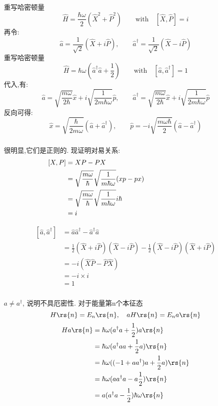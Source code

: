 \begin{frame}
    \frametitle{}
  重写哈密顿量
    \[  \hat{H}= \frac{\hbar \omega }{2} (\hat{X}^2 + \hat{P}^2 ) \qquad \text{with} \quad [\hat{X},\hat{P}]=i \]
  再令:
  \[ \hat{a}= \frac{1 }{\sqrt{2}} (\hat{X} + i\hat{P} ), \qquad \hat{a}^\dagger= \frac{1 }{\sqrt{2}} (\hat{X} - i\hat{P} ) \]
  重写哈密顿量
  \[  \hat{H}= \hbar \omega \left(\hat{a}^\dagger \hat{a} + \frac{1 }{2}\right) \qquad \text{with} \quad [\hat{a},\hat{a}^\dagger]=1 \]
  代入,有:
  \[ \hat{a}= \sqrt{\frac{m\omega}{2\hbar}}\hat{x} + i \sqrt{\frac{1}{2 m \hbar \omega}} \hat{p}, \qquad 
  \hat{a}^\dagger= \sqrt{\frac{m\omega}{2\hbar}}\hat{x} + i \sqrt{\frac{1}{2 m \hbar \omega}} \hat{p}\]
  反向可得:
  \[ \hat{x}= \sqrt{\frac{\hbar}{2m\omega}} (\hat{a}+ \hat{a}^\dagger), \qquad 
  \hat{p}= -i \sqrt{\frac{m \omega \hbar}{2}} (\hat{a}-\hat{a}^\dagger)\]
\end{frame}

\begin{frame}
    \frametitle{}
    很明显,它们是正则的. 现证明对易关系: 
  \[ \begin{aligned}
      [X,P] &=   XP- PX \\ 
      &=  \sqrt{\frac{m\omega}{\hbar}} \sqrt{\frac{1}{m \hbar \omega}}   (xp-px)  {\hspace*{8em}}~~\\
      &=  \sqrt{\frac{m\omega}{\hbar}} \sqrt{\frac{1}{m \hbar \omega}} i \hbar  \\
      &= i
  \end{aligned}\]
   
  \[ \begin{aligned}
       [\hat{a},\hat{a}^\dagger] &=   \hat{a}\hat{a}^\dagger - \hat{a}^\dagger\hat{a} \\ 
       &= \frac{1}{2} (\hat{X} + i\hat{P} )  (\hat{X} - i\hat{P} )  - \frac{1}{2} (\hat{X} - i\hat{P} ) (\hat{X} + i\hat{P} )  \\
       &=  -i (\hat{X}\hat{P}-\hat{P}\hat{X}) \\
       &= -i \times i \\
       &= 1
   \end{aligned}\]
\end{frame}


\begin{frame} 
    \frametitle{}
$ a \not =  a^\dagger $, 说明不具厄密性. 对于能量第n个本征态 \\ 
\[ H  \rs{n} = E_n  \rs{n}, \quad  aH  \rs{n} =E_n a \rs{n}\]
\[
\begin{aligned}
      H a \rs{n} &=\hbar \omega (  a ^\dagger a + \frac{1}{2} )a \rs{n} \\ 
      &= \hbar \omega (   a ^\dagger a a  + \frac{1}{2} a ) \rs{n} \\ 
      &= \hbar \omega (   (-1+a a ^\dagger )a + \frac{1}{2} a ) \rs{n} \\ 
      &= \hbar \omega  (  a a ^\dagger a -  a \frac{1}{2} ) \rs{n} \\ 
      &=  a( a ^\dagger a -  \frac{1}{2} )\hbar \omega \rs{n} 
\end{aligned}
\]
\end{frame}


